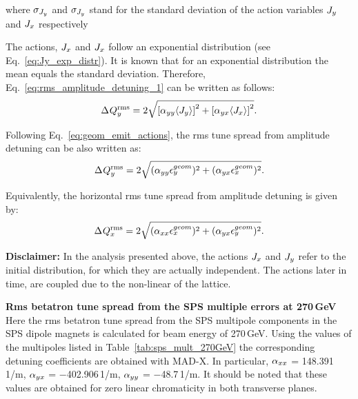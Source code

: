 where $\sigma_{{J_y}}$ and $\sigma_{{J_y}}$ stand for the standard deviation of the action variables ${J_y}$ and ${J_x}$ respectively

The actions, ${J_x}$ and ${J_x}$ follow an exponential distribution (see Eq.~\eqref{eq:Jy_exp_distr}). It is known that for an exponential distribution the mean equals the standard deviation. Therefore, Eq.~\ref{eq:rms_amplitude_detuning_1} can be written as follows:
\begin{equation}\label{eq:rms_amplitute_detuning_2}
    {\Delta\: \!Q^\mathrm{rms}_{y}} = 2 \sqrt{\left [\alpha_{yy} \langle {J_y} \rangle \right ]^2 + \left [ \alpha_{yx} \langle {J_x} \rangle \right ]^2 }.
\end{equation}

Following Eq.~\eqref{eq:geom_emit_actions}, the rms tune spread from amplitude detuning can be also written as:
\begin{equation}\label{eq:rms_amplitute_detuning_3}
    {\Delta\: \!Q^\mathrm{rms}_{y}} = 2 \sqrt{(\alpha_{yy} {\epsilon_y^{geom}} )^2 + ( \alpha_{yx} {\epsilon_x^{geom}})^2 }.
\end{equation}

Equivalently, the horizontal rms tune spread from amplitude detuning is given by:
\begin{equation}\label{eq:rms_amplitute_detuning_3_x}
    {\Delta\: \!Q^\mathrm{rms}_{x}} = 2 \sqrt{(\alpha_{xx} {\epsilon_x^{geom}} )^2 + ( \alpha_{yx} {\epsilon_y^{geom}})^2 }.
\end{equation}


\textbf{Disclaimer:} In the analysis presented above, the actions ${J_x}$ and ${J_y}$ refer to the initial distribution, for which they are actually independent. The actions later in time, are coupled due to the non-linear
of the lattice. %


\normalsize{\textbf{Rms betatron tune spread from the SPS multiple errors at 270\,GeV}}\\
Here the rms betatron tune spread from the SPS multipole components in the SPS dipole magnets is calculated for beam energy of 270\,GeV. Using the values of the multipoles listed in Table~\ref{tab:sps_mult_270GeV} the corresponding detuning coefficients are obtained with MAD-X. In particular, ${\alpha_{xx}}$ = 148.391\,1/m, ${\alpha_{yx}}$ = $-$402.906\,1/m, ${\alpha_{yy}}$ = $-$48.7\,1/m. It should be noted that these values are obtained for zero linear chromaticity in both transverse planes.